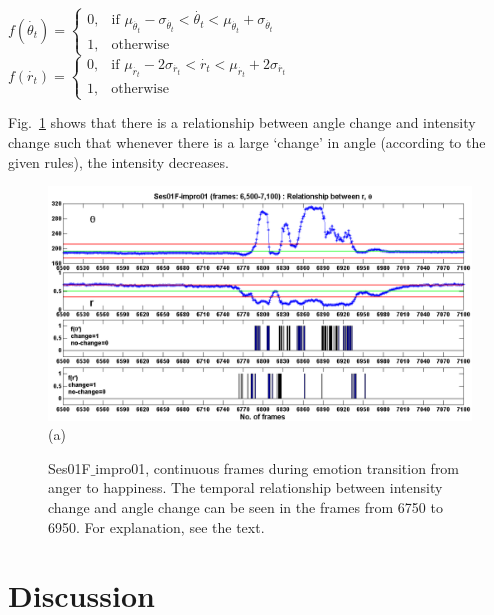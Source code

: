 \documentclass[10pt,journal,cspaper,compsoc]{IEEEtran}
\begin{document}
\begin{center}
$f(\dot{\theta_{t}}) = \left\{ \begin{array}{ll}
0, 	&	 \text{if } \mu_{\dot{\theta_{t}}}-\sigma_{\dot{\theta_{t}}}<\dot{\theta_{t}}<\mu_{\dot{\theta_{t}}}+\sigma_{\dot{\theta_{t}}} \\ 
1, 	&	 \text{otherwise}
\end{array}\right.$ \\
$f(\dot{r_{t}}) = \left\{ \begin{array}{ll}
0, 	&	 \text{if } \mu_{\dot{r_{t}}}-2\sigma_{\dot{r_{t}}}<\dot{r_{t}}<\mu_{\dot{r_{t}}}+2\sigma_{\dot{r_{t}}} \\ 
1, 	&	 \text{otherwise}
\end{array}\right.$
\end{center}

Fig.~\ref{fig_controlchart} shows that there is a relationship between angle change and intensity change such that whenever there is a large `change' in angle (according to the given rules), the intensity decreases.

\begin{figure}[!t]
\begin{center}
{
\centering
\includegraphics[width=1\textwidth]{figures/Ch7/6750_6950_change_1.png} (a)
}
\end{center}
\caption{Ses01F$\_$impro01, continuous frames during emotion transition from anger to happiness. The temporal relationship between intensity change and angle change can be seen in the frames from 6750 to 6950. For explanation, see the text.}
\label{fig_controlchart}
\end{figure}

\section{Discussion}
\label{sec_discussion}
\end{document}
